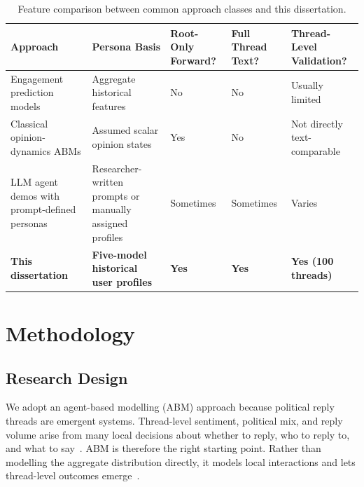 \documentclass[logo,bsc,singlespacing,parskip,online]{infthesis}
\begin{document}
\begin{table}[ht]
\centering
\caption{Feature comparison between common approach classes and this dissertation.}
\label{tab:approach_feature_compare}
\small
\setlength{\tabcolsep}{5pt}
\renewcommand{\arraystretch}{1.15}
\begin{tabularx}{\textwidth}{@{}>{\raggedright\arraybackslash}p{}>{\raggedright\arraybackslash}X>{\centering\arraybackslash}p{}>{\centering\arraybackslash}p{}>{\raggedright\arraybackslash}p{}@{}}
\toprule
\textbf{Approach} & \textbf{Persona Basis} & \textbf{Root-Only Forward?} & \textbf{Full Thread Text?} & \textbf{Thread-Level Validation?} \\
\midrule
Engagement prediction models & Aggregate historical features & No & No & Usually limited \\
Classical opinion-dynamics ABMs & Assumed scalar opinion states & Yes & No & Not directly text-comparable \\
LLM agent demos with prompt-defined personas & Researcher-written prompts or manually assigned profiles & Sometimes & Sometimes & Varies \\
\textbf{This dissertation} & \textbf{Five-model historical user profiles} & \textbf{Yes} & \textbf{Yes} & \textbf{Yes (100 threads)} \\
\bottomrule
\end{tabularx}
\end{table}

\chapter{Methodology}

\section{Research Design}

We adopt an agent-based modelling (ABM) approach because political reply threads are emergent systems. Thread-level sentiment, political mix, and reply volume arise from many local decisions about whether to reply, who to reply to, and what to say~\citep{diehl2016political,smith2021twitterbehaviors,smith2022politicalcontent}. ABM is therefore the right starting point. Rather than modelling the aggregate distribution directly, it models local interactions and lets thread-level outcomes emerge~\citep{axelrod1997complexity,epstein1996growing}.
\end{document}
